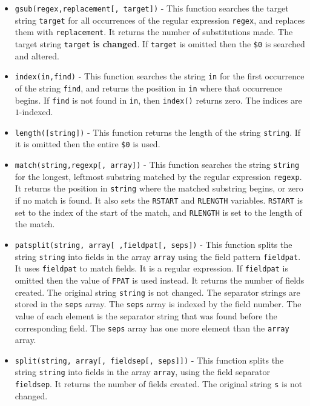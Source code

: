 \begin{itemize}
  \item \lstinline|gsub(regex,replacement[, target])| - This function searches the target string \lstinline|target| for all occurrences of the regular expression \lstinline|regex|, and replaces them with \lstinline|replacement|. It returns the number of substitutions made. The target string \lstinline|target| \textbf{is changed}. If \lstinline|target| is omitted then the \lstinline|$0| is searched and altered.
  \item \lstinline|index(in,find)| - This function searches the string \lstinline|in| for the first occurrence of the string \lstinline|find|, and returns the position in \lstinline|in| where that occurrence begins. If \lstinline|find| is not found in \lstinline|in|, then \lstinline|index()| returns zero. The indices are $1$-indexed.
  \item \lstinline|length([string])| - This function returns the length of the string \lstinline|string|. If it is omitted then the entire \lstinline|$0| is used.
  \item \lstinline|match(string,regexp[, array])| - This function searches the string \lstinline|string| for the longest, leftmost substring matched by the regular expression \lstinline|regexp|. It returns the position in \lstinline|string| where the matched substring begins, or zero if no match is found. It also sets the \lstinline|RSTART| and \lstinline|RLENGTH| variables.
    \lstinline|RSTART| is set to the index of the start of the match, and \lstinline|RLENGTH| is set to the length of the match.
  \item \lstinline|patsplit(string, array[ ,fieldpat[, seps])| - This function splits the string \lstinline|string| into fields in the array \lstinline|array| using the field pattern \lstinline|fieldpat|. It uses \lstinline|fieldpat| to match fields. It is a regular expression. If \lstinline|fieldpat| is omitted then the value of \lstinline|FPAT| is used instead. It returns the number of fields created. The original string \lstinline|string| is not changed.
    The separator strings are stored in the \lstinline|seps| array. The \lstinline|seps| array is indexed by the field number. The value of each element is the separator string that was found before the corresponding field. The \lstinline|seps| array has one more element than the \lstinline|array| array.
  \item \lstinline|split(string, array[, fieldsep[, seps]])| - This function splits the string \lstinline|string| into fields in the array \lstinline|array|, using the field separator \lstinline|fieldsep|. It returns the number of fields created. The original string \lstinline|s| is not changed.

\end{itemize}
